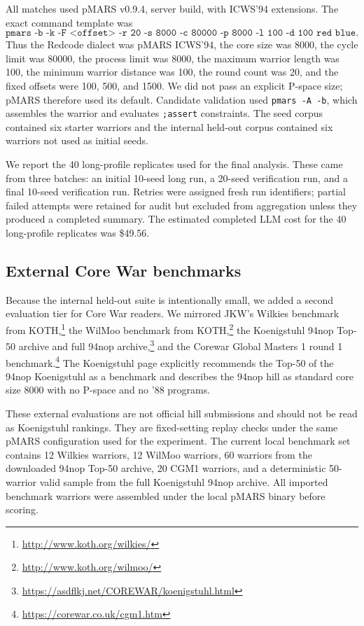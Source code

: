 \documentclass[11pt]{article}
\begin{document}
All matches used pMARS v0.9.4, server build, with ICWS'94 extensions. The exact command template was
\[
\texttt{pmars -b -k -F <offset> -r 20 -s 8000 -c 80000 -p 8000 -l 100 -d 100 red blue}.
\]
Thus the Redcode dialect was pMARS ICWS'94, the core size was 8000, the cycle limit was 80000, the process limit was 8000, the maximum warrior length was 100, the minimum warrior distance was 100, the round count was 20, and the fixed offsets were 100, 500, and 1500. We did not pass an explicit P-space size; pMARS therefore used its default. Candidate validation used \texttt{pmars -A -b}, which assembles the warrior and evaluates \texttt{;assert} constraints. The seed corpus contained six starter warriors and the internal held-out corpus contained six warriors not used as initial seeds.

We report the 40 long-profile replicates used for the final analysis. These came from three batches: an initial 10-seed long run, a 20-seed verification run, and a final 10-seed verification run. Retries were assigned fresh run identifiers; partial failed attempts were retained for audit but excluded from aggregation unless they produced a completed summary. The estimated completed LLM cost for the 40 long-profile replicates was \$49.56.

\subsection{External Core War benchmarks}

Because the internal held-out suite is intentionally small, we added a second evaluation tier for Core War readers. We mirrored JKW's Wilkies benchmark from KOTH,\footnote{\url{http://www.koth.org/wilkies/}} the WilMoo benchmark from KOTH,\footnote{\url{http://www.koth.org/wilmoo/}} the Koenigstuhl 94nop Top-50 archive and full 94nop archive,\footnote{\url{https://asdflkj.net/COREWAR/koenigstuhl.html}} and the Corewar Global Masters 1 round 1 benchmark.\footnote{\url{https://corewar.co.uk/cgm1.htm}} The Koenigstuhl page explicitly recommends the Top-50 of the 94nop Koenigstuhl as a benchmark and describes the 94nop hill as standard core size 8000 with no P-space and no '88 programs.

These external evaluations are not official hill submissions and should not be read as Koenigstuhl rankings. They are fixed-setting replay checks under the same pMARS configuration used for the experiment. The current local benchmark set contains 12 Wilkies warriors, 12 WilMoo warriors, 60 warriors from the downloaded 94nop Top-50 archive, 20 CGM1 warriors, and a deterministic 50-warrior valid sample from the full Koenigstuhl 94nop archive. All imported benchmark warriors were assembled under the local pMARS binary before scoring.
\end{document}
